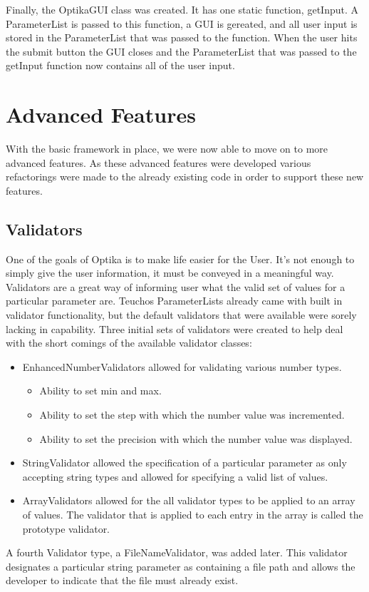 Finally, the OptikaGUI class was created. It has one static function, getInput. A ParameterList is passed to this function, a
GUI is gereated, and all user input is stored in the ParameterList that was passed to the function. When the user hits the submit
button the GUI closes and the ParameterList that was passed to the getInput function now contains all of the user input.


\section{Advanced Features}
With the basic framework in place, we were now able to move on to more advanced features. As these advanced features
were developed various refactorings were made to the already existing code in order to support these new features.

	\subsection{Validators}
	One of the goals of Optika is to make life easier for the User. It's not enough to simply give the user information, it must
	be conveyed in a meaningful way. Validators are a great way of informing user what the valid set of values for a particular parameter are.
	Teuchos ParameterLists already came with built in validator functionality, but the default validators that were available
	were sorely lacking in capability. Three initial sets of validators were created to help deal with the short comings of
	the available validator classes:
	\begin{itemize}
		\item EnhancedNumberValidators allowed for validating various number types.
			\begin{itemize}
				\item Ability to set min and max.
				\item Ability to set the step with which the number value was incremented.
				\item Ability to set the precision with which the number value was displayed.
			\end{itemize}
		\item StringValidator allowed the specification of a particular parameter as only accepting string types 
		and allowed for specifying a valid list of values.
		\item ArrayValidators allowed for the all validator types to be applied to an array of values. The validator
		that is applied to each entry in the array is called the prototype validator.
	\end{itemize}
	A fourth Validator type, a FileNameValidator, was added later. This validator designates a particular string parameter
	as containing a file path and allows the developer to indicate that the file must already exist.


